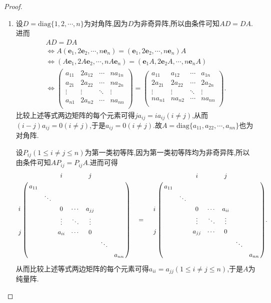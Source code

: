 \documentclass[../../main.tex]{subfiles}
\begin{document}
\begin{proof}
\begin{enumerate}
\item 设\(D=\text{diag}\{1,2,\cdots,n\}\)为对角阵,因为$D$为非奇异阵,所以由条件可知\(AD = DA\).进而
\begin{gather*}
AD=DA
\\
\Leftrightarrow A\left( \boldsymbol{e}_1,2\boldsymbol{e}_2,\cdots ,n\boldsymbol{e}_n \right) =\left( \boldsymbol{e}_1,2\boldsymbol{e}_2,\cdots ,n\boldsymbol{e}_n \right) A
\\
\Leftrightarrow \left( A\boldsymbol{e}_1,2A\boldsymbol{e}_2,\cdots ,nA\boldsymbol{e}_n \right) =\left( \boldsymbol{e}_1A,2\boldsymbol{e}_2A,\cdots ,n\boldsymbol{e}_nA \right) 
\\
\Leftrightarrow \left( \begin{matrix}
a_{11}&		2a_{12}&		\cdots&		na_{1n}\\
a_{21}&		2a_{22}&		\cdots&		na_{2n}\\
\vdots&		\vdots&		\ddots&		\vdots\\
a_{n1}&		2a_{n2}&		\cdots&		na_{nn}\\
\end{matrix} \right) =\left( \begin{matrix}
a_{11}&		a_{12}&		\cdots&		a_{1n}\\
2a_{21}&		2a_{22}&		\cdots&		2a_{2n}\\
\vdots&		\vdots&		\ddots&		\vdots\\
na_{n1}&		na_{n2}&		\cdots&		na_{nn}\\
\end{matrix} \right).
\end{gather*}
比较上述等式两边矩阵的每个元素可得$ja_{ij}=ia_{ij}\left( i\ne j \right)$,从而$\left( i-j \right) a_{ij}=0\left( i\ne j \right)$,于是$a_{ij}=0\left( i\ne j \right) $.故\(A=\text{diag}\{a_{11},a_{22},\cdots,a_{nn}\}\)也为对角阵.

设\(P_{ij}(1\leq i\neq j\leq n)\)为第一类初等阵,因为第一类初等阵均为非奇异阵,所以由条件可知\(AP_{ij}=P_{ij}A\).进而可得
\begin{align*}
\bordermatrix{%
&    &		&		i&		&		j&		&		\cr
&    a_{11}&		&		&		&		&		&		\cr
&    &		\ddots&		&		&		&		&		\cr
i&    &		&		0&		\cdots&		a_{jj}&		&		\cr
&   &		&		\vdots&		\ddots&		\vdots&		&		\cr
j&    &		&		a_{ii}&		\cdots&		0&		&		\cr
&    &		&		&		&		&		\ddots&		\cr
&    &		&		&		&		&		&		a_{nn}\cr
} \quad =\quad \bordermatrix{%
&    &		&		i&		&		j&		&		\cr
&    a_{11}&		&		&		&		&		&		\cr
&    &		\ddots&		&		&		&		&		\cr
i&    &		&		0&		\cdots&		a_{ii}&		&		\cr
&    &		&		\vdots&		\ddots&		\vdots&		&		\cr
j&   &		&		a_{jj}&		\cdots&		0&		&		\cr
&    &		&		&		&		&		\ddots&		\cr
&    &		&		&		&		&		&		a_{nn}\cr
} .
\end{align*}
从而比较上述等式两边矩阵的每个元素可得\(a_{ii}=a_{jj}(1\leq i\neq j\leq n)\),于是\(A\)为纯量阵.


\end{enumerate}
\end{proof}
\end{document}
